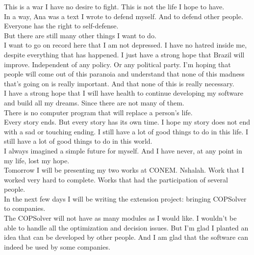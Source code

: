 \documentclass[11pt]{book}
\begin{document}
\noindent This is a war I have no desire to fight. This is not the life I hope to have. \\

\noindent In a way, Ana was a text I wrote to defend myself. And to defend other people. Everyone has the right to self-defense. \\

\noindent But there are still many other things I want to do. \\

\noindent I want to go on record here that I am not depressed. I have no hatred inside me, despite everything that has happened. I just have a strong hope that Brazil will improve. Independent of any policy. Or any political party. I'm hoping that people will come out of this paranoia and understand that none of this madness that's going on is really important. And that none of this is really necessary. \\

\noindent I have a strong hope that I will have health to continue developing my software and build all my dreams. Since there are not many of them. \\

\noindent There is no computer program that will replace a person's life. \\

\noindent Every story ends. But every story has its own time. I hope my story does not end with a sad or touching ending. I still have a lot of good things to do in this life.  I still have a lot of good things to do in this world. \\

\noindent I always imagined a simple future for myself. And I have never, at any point in my life, lost my hope. \\

\noindent Tomorrow I will be presenting my two works at CONEM. Nshalah. Work that I worked very hard to complete. Works that had the participation of several people. \\

\noindent In the next few days I will be writing the extension project: bringing COPSolver to companies. \\

\noindent The COPSolver will not have as many modules as I would like. I wouldn't be able to handle all the optimization and decision issues. But I'm glad I planted an idea that can be developed by other people. And I am glad that the software can indeed be used by some companies. \\
\end{document}
